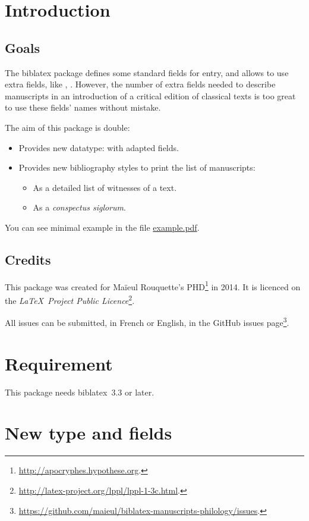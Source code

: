 \documentclass{ltxdockit}[2011/03/25]
\newcommand{\biblatex}{biblatex\xspace}
\begin{document}
\printtitlepage
\tableofcontents
\section{Introduction}
\subsection{Goals}
The \biblatex package defines some standard fields for entry, and allows to use extra fields, like , . However, the number of extra fields needed to describe manuscripts in an introduction of a critical edition of classical texts is too great to use these fields' names without mistake.

The aim of this package is double:

\begin{itemize}
\item Provides new datatype:  with adapted fields.
\item Provides new bibliography styles to print the list of manuscripts:
\begin{itemize}
	\item As a detailed list of witnesses of a text.
	\item As a \emph{conspectus siglorum}.
\end{itemize}
\end{itemize}

You can see minimal example in the file \href{file:example.pdf}{example.pdf}.
\subsection{Credits}

This package was created for Maïeul Rouquette's PHD\footnote{\url{http://apocryphes.hypothese.org}.} in 2014. It is licenced on the \emph{\LaTeX\ Project Public Licence}\footnote{\url{http://latex-project.org/lppl/lppl-1-3c.html}.}.

All issues can be submitted, in French or English, in the GitHub issues page\footnote{\url{https://github.com/maieul/biblatex-manuscripts-philology/issues}.}.

\section{Requirement}

This package needs \biblatex~3.3 or later.

\section{New type and fields}
\end{document}
